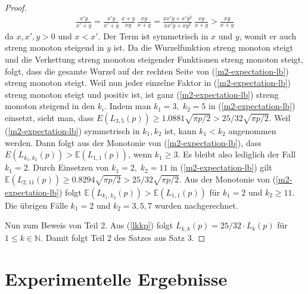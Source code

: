 \documentclass[a4paper, 11pt, ngerman]{article}
\newcommand{\E}{\mathbb{E}}
\newcommand{\N}{\mathbb{N}}
\theoremstyle{definition}
\theoremstyle{plain}
\theoremstyle{remark}
\begin{document}
\begin{proof}
    \begin{align*}
        \frac {x'y} {x' + y}
        = \frac {x'y} {x' + y} \, \frac {x + y} {xy} \, \frac {xy} {x + y}
        = \frac {xx'y + x'y^2} {xx'y + xy^2} \, \frac {xy} {x + y}
        > \frac {xy} {x + y}
    \end{align*}
    da $x, x', y > 0$ und $x < x'$. Der Term ist symmetrisch in $x$ und $y$, womit er auch streng monoton steigend in $y$ ist. Da die Wurzelfunktion streng monoton steigt und die Verkettung streng monoton steigender Funktionen streng monoton steigt, folgt, dass die gesamte Wurzel auf der rechten Seite von (\ref{m2-expectation-lb}) streng monoton steigt. Weil nun jeder einzelne Faktor in (\ref{m2-expectation-lb}) streng monoton steigt und positiv ist, ist ganz (\ref{m2-expectation-lb}) streng monoton steigend in den $k_i$. Indem man $k_1 = 3,\; k_2 = 5$ in (\ref{m2-expectation-lb}) einsetzt, sieht man, dass $E(L_{3, 5}(p)) \ge 1.0881 \sqrt{\pi p /2}  > 25 / 32 \sqrt{\pi p / 2}$. Weil (\ref{m2-expectation-lb}) symmetrisch in $k_1, k_2$ ist, kann $k_1 < k_2$ angenommen werden. Dann folgt aus der Monotonie von (\ref{m2-expectation-lb}), dass $E(L_{k_1, k_2}(p)) > \E(L_{1, 1}(p))$, wenn $k_1 \ge 3$. Es bleibt also lediglich der Fall $k_1 = 2$. Durch Einsetzen von $k_1 = 2, \; k_2 = 11$ in (\ref{m2-expectation-lb}) gilt $\E(L_{2, 11}(p)) \ge 0.8294 \sqrt{\pi p / 2} > 25 / 32 \sqrt{\pi p / 2}$. Aus der Monotonie von (\ref{m2-expectation-lb}) folgt $\E(L_{k_1, k_2}(p)) > \E(L_{1, 1}(p))$ für $k_1 = 2$ und $k_2 \ge 11$. Die übrigen Fälle $k_1 = 2$ und $k_2 = 3, 5, 7$ wurden nachgerechnet.

    Nun zum Beweis von Teil 2. Aus (\ref{lkkp}) folgt $L_{k, k}(p) = 25 / 32 \cdot L_{k}(p)$ für $1 \le k \in \N$. Damit folgt Teil 2 des Satzes aus Satz 3.
\end{proof}

\section{Experimentelle Ergebnisse}
\end{document}

